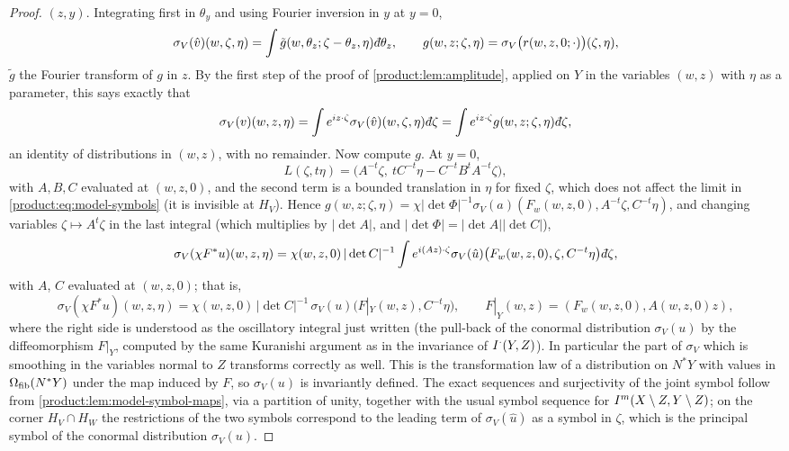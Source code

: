 \begin{proof}
$(z,y)$. Integrating first in $\theta_y$ and using Fourier inversion in $y$ at $y=0$,
\begin{equation*}
\sigma_V(\hat v)(w,\zeta,\eta)=\int\tilde g(w,\theta_z;\zeta-\theta_z,\eta)
\,\dbar\theta_z,\qquad g(w,z;\zeta,\eta)=\sigma_V\big(r(w,z,0;\cdot)\big)(\zeta,\eta),
\end{equation*}
$\tilde g$ the Fourier transform of $g$ in $z$. By the first step of the proof of
\cref{product:lem:amplitude}, applied on $Y$ in the variables $(w,z)$ with $\eta$ as
a parameter, this says exactly that
\begin{equation*}
\sigma_V(v)(w,z,\eta)=\int e^{iz\cdot\zeta}\sigma_V(\hat v)(w,\zeta,\eta)\,\dbar\zeta
=\int e^{iz\cdot\zeta}g(w,z;\zeta,\eta)\,\dbar\zeta,
\end{equation*}
an identity of distributions in $(w,z)$, with no remainder. Now compute $g$. At
$y=0$,
\begin{equation*}
L(\zeta,t\eta)=\big(A^{-t}\zeta,\ tC^{-t}\eta-C^{-t}B^tA^{-t}\zeta\big),
\end{equation*}
with $A,B,C$ evaluated at $(w,z,0)$, and the second term is a bounded translation
in $\eta$ for fixed $\zeta$, which does not affect the limit in
\eqref{product:eq:model-symbols} (it is invisible at $H_V$). Hence
$g(w,z;\zeta,\eta)=\chi|\det\Phi|^{-1}\sigma_V(a)(F_w(w,z,0),A^{-t}\zeta,C^{-t}\eta)$,
and changing variables $\zeta\mapsto A^t\zeta$ in the last integral (which
multiplies by $|\det A|$, and $|\det\Phi|=|\det A||\det C|$),
\begin{equation*}
\sigma_V(\chi F^*u)(w,z,\eta)=\chi(w,z,0)\,|\det C|^{-1}
\int e^{i(Az)\cdot\zeta}\sigma_V(\hat u)\big(F_w(w,z,0),\zeta,C^{-t}\eta\big)
\,\dbar\zeta,
\end{equation*}
with $A$, $C$ evaluated at $(w,z,0)$; that is,
\begin{equation*}
\sigma_V(\chi F^*u)(w,z,\eta)=\chi(w,z,0)\,|\det C|^{-1}\,
\sigma_V(u)\big(F|_Y(w,z),C^{-t}\eta\big),\qquad
F|_Y(w,z)=(F_w(w,z,0),A(w,z,0)z),
\end{equation*}
where the right side is understood as the oscillatory integral just written (the
pull-back of the conormal distribution $\sigma_V(u)$ by the diffeomorphism $F|_Y$,
computed by the same Kuranishi argument as in the invariance of $I^{\cdot}(Y,Z)$).
In particular the part of $\sigma_V$ which is smoothing in the variables normal to
$Z$ transforms correctly as well. This is the transformation
law of a distribution on $N^*Y$ with values in $\Omega_{\mathrm{fib}}(N^*Y)$ under the map
induced by $F$, so $\sigma_V(u)$ is invariantly defined. The exact sequences and
surjectivity of the joint symbol follow from \cref{product:lem:model-symbol-maps},
via a partition of unity, together with the usual symbol sequence for
$I^{m}(X\setminus Z,Y\setminus Z)$; on the corner $H_V\cap H_W$ the restrictions
of the two symbols correspond to the leading term of $\sigma_V(\hat u)$ as a
symbol in $\zeta$, which is the principal symbol of the conormal distribution
$\sigma_V(u)$.
\end{proof}


